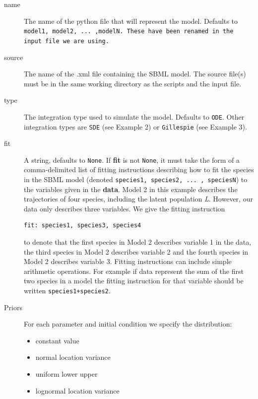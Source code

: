 \documentclass[a4paper]{report}
\begin{document}
\begin{description}
\item[name] The name of the python file that will represent the model. Defaults to \tt model1\rm, \tt model2\rm, ... ,\tt modelN\rm.  These have been renamed in the input file we are using.
\item[source] The name of the .xml file containing the SBML model. The source file(s) must be in the same working directory as the scripts and the input file.
\item[type] The integration type used to simulate the model. Defaults to \verb$ODE$. Other integration types are \verb$SDE$ (see Example 2) or \verb$Gillespie$ (see Example 3).
\item[fit] A string, defaults to \verb$None$. If \textbf{fit} is not \verb$None$, it must take the form of a comma-delimited list of fitting instructions describing how to fit the species in the SBML model (denoted \verb$species1, species2, ... , speciesN$) to the variables given in the \textbf{data}. Model 2 in this example describes the trajectories of four species, including the latent population \emph{L}. However, our data only describes three variables.  We give the fitting instruction
\begin{verbatim}
fit: species1, species3, species4
\end{verbatim}
to denote that the first species in Model 2 describes variable 1 in the data, the third species in Model 2 describes variable 2 and the fourth species in Model 2 describes variable 3. Fitting instructions can include simple arithmetic operations. For example if data represent the sum of the first two species in a model the fitting instruction for that variable should be written \verb$species1+species2$. 
 \item[Priors] For each parameter and initial condition we specify the distribution:
\begin{itemize}
\item constant  value
\item normal location variance
\item uniform lower upper
\item lognormal location variance
\end{itemize}
\end{description}
\end{document}
